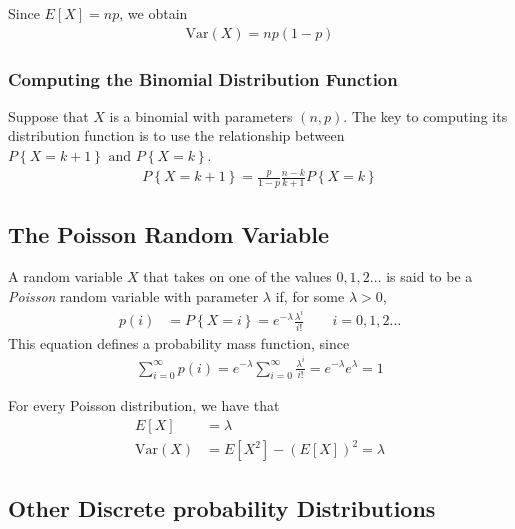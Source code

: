 \documentclass[a4paper]{article}
\begin{document}
Since $E[X]=np$, we obtain \\
\begin{align}
  \text{Var}(X) = np(1-p) 
\end{align}
\subsubsection{Computing the Binomial Distribution Function}
Suppose that $X$ is a binomial with parameters $(n,p)$. The key to computing its distribution function is to use the relationship between $P\left\{ X=k+1 \right\} \text{ and } P\left\{ X=k \right\}$.
\begin{align}
  P\left\{ X= k+1 \right\} = \frac{p}{1-p}\frac{n-k}{k+1} P\left\{ X=k \right\}
\end{align}
\subsection{The Poisson Random Variable} %
\label{sub:The Poisson Random Variable}
A random variable $X$ that takes on one of the values $0,1,2\dots$ is said to be a \emph{Poisson} random variable with parameter $\lambda$ if, for some $ \lambda >0$,
\begin{align}
  p(i) & = P\left\{ X=i \right\}=e^{-\lambda}\frac{\lambda^i}{i!} \qquad i=0,1,2\dots
\end{align}
This equation defines a probability mass function, since
\begin{align}
  \sum_{i=0}^\infty p\left( i \right) = e^{-\lambda} \sum_{i=0}^\infty \frac{\lambda^i}{i!}= e^{-\lambda}e^\lambda = 1
\end{align}

For every Poisson distribution, we have that 
\begin{align}
  E[X] & = \lambda \\
  \text{Var}(X) & =E[X^2]-(E[X])^2= \lambda
\end{align}
\subsection{Other Discrete probability Distributions} %
\label{sub:Other Discrete probability Distributions}
\end{document}
